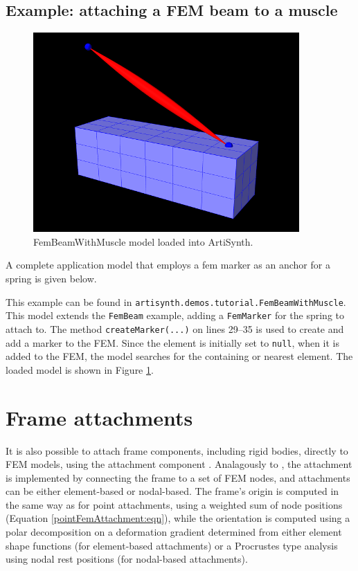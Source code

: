 \subsection{Example: attaching a FEM beam to a muscle}

\begin{figure}[ht]
	\centering
	\includegraphics[width=\imglength]{images/FemBeamWithMuscle}
	\caption{FemBeamWithMuscle model loaded into ArtiSynth.}
	\label{fig:fem:beamwithmuscle}
\end{figure}

A complete application model that employs a fem marker as an anchor for a spring
is given below.
\lstset{numbers=left}

\lstset{numbers=none}
This example can be found in {\tt artisynth.demos.tutorial.FemBeamWithMuscle}.
This model extends the {\tt FemBeam} example, adding a {\tt FemMarker} for the
spring to attach to.  The method {\tt createMarker(...)} on lines 29--35
is used to create and add a marker to the FEM.  Since the element is initially
set to {\tt null}, when it is added to the FEM, the model searches for the
containing or nearest element.  The loaded model is shown in Figure 
\ref{fig:fem:beamwithmuscle}.


\section{Frame attachments}
\label{sec:fem:frameattachments}

It is also possible to attach frame components, including rigid
bodies, directly to FEM models, using the attachment component
.
Analagously to
, the
attachment is implemented by connecting the frame to a set of FEM
nodes, and attachments can be either element-based or nodal-based.  The
frame's origin is computed in the same way as for point attachments,
using a weighted sum of node positions (Equation
\ref{pointFemAttachment:eqn}), while the orientation is computed using
a polar decomposition on a deformation gradient determined from either
element shape functions (for element-based attachments) or a
Procrustes type analysis using nodal rest positions (for nodal-based attachments).

